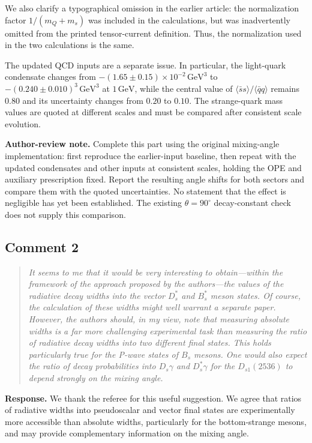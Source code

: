 \documentclass[11pt,a4paper]{article}
\newcommand{\authornote}[1]{\par\smallskip\noindent
 \colorbox{gray!10}{\parbox{\dimexpr\linewidth-2\fboxsep\relax}{\small
 \textbf{Author-review note.} #1}}\par\smallskip}
\newcommand{\commentheading}[1]{\Needspace{7\baselineskip}\subsection*{Comment #1}}
\begin{document}
We also clarify a typographical omission in the earlier article: the
normalization factor $1/(m_Q+m_s)$ was included in the calculations,
but was inadvertently omitted from the printed tensor-current definition.
Thus, the normalization used in the two calculations is the same.

The updated QCD inputs are a separate issue. In particular, the light-quark
condensate changes from
$-(1.65\pm0.15)\times10^{-2}\,\mathrm{GeV}^3$ to
$-(0.240\pm0.010)^3\,\mathrm{GeV}^3$ at $1\,\mathrm{GeV}$, while
the central value of $\langle\bar ss\rangle/\langle\bar qq\rangle$
remains $0.80$ and its uncertainty changes from $0.20$ to $0.10$.
The strange-quark mass values are quoted at different scales and must
be compared after consistent scale evolution.

\authornote{Complete this part using the original mixing-angle implementation:
 first reproduce the earlier-input baseline, then repeat with the updated
 condensates and other inputs at consistent scales, holding the OPE and
 auxiliary prescription fixed. Report the resulting angle shifts for both
 sectors and compare them with the quoted uncertainties. No statement that
 the effect is negligible has yet been established. The existing
 $\theta=90^\circ$ decay-constant check does not supply this comparison.}

\commentheading{2}
\begin{quote}\small\itshape
It seems to me that it would be very interesting to obtain---within the
framework of the approach proposed by the authors---the values of the
radiative decay widths into the vector $D_s^*$ and $B_s^*$ meson states.
Of course, the calculation of these widths might well warrant a separate
paper. However, the authors should, in my view, note that measuring
absolute widths is a far more challenging experimental task than
measuring the ratio of radiative decay widths into two different final
states. This holds particularly true for the P-wave states of $B_s$
mesons. One would also expect the ratio of decay probabilities into
$D_s\gamma$ and $D_s^*\gamma$ for the $D_{s1}(2536)$ to depend strongly
on the mixing angle.
\end{quote}

\textbf{Response.}
We thank the referee for this useful suggestion. We agree that ratios
of radiative widths into pseudoscalar and vector final states are
experimentally more accessible than absolute widths, particularly for
the bottom-strange mesons, and may provide complementary information on
the mixing angle.
\end{document}
